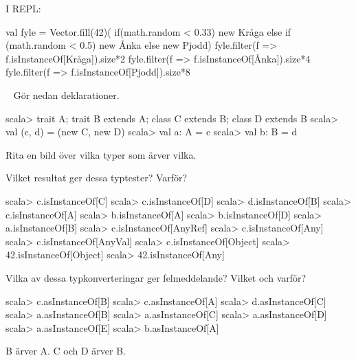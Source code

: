 I REPL:
\begin{REPL}
val fyle = Vector.fill(42)(
  if(math.random < 0.33) new Kråga else
  if (math.random < 0.5) new Ånka else
  new Pjodd)
fyle.filter(f => f.isInstanceOf[Kråga]).size*2
fyle.filter(f => f.isInstanceOf[Ånka]).size*4
fyle.filter(f => f.isInstanceOf[Pjodd]).size*8
\end{REPL}

\QUESTEND






\QUESTBEGIN

\Task  \what~  Gör nedan deklarationer.
\begin{REPL}
scala> trait A; trait B extends A; class C extends B; class D extends B
scala> val (c, d) = (new C, new D)
scala> val a: A = c
scala> val b: B = d
\end{REPL}

\Subtask Rita en bild över vilka typer som ärver vilka.

\Subtask Vilket resultat ger dessa typtester? Varför?
\begin{REPL}
scala> c.isInstanceOf[C]
scala> c.isInstanceOf[D]
scala> d.isInstanceOf[B]
scala> c.isInstanceOf[A]
scala> b.isInstanceOf[A]
scala> b.isInstanceOf[D]
scala> a.isInstanceOf[B]
scala> c.isInstanceOf[AnyRef]
scala> c.isInstanceOf[Any]
scala> c.isInstanceOf[AnyVal]
scala> c.isInstanceOf[Object]
scala> 42.isInstanceOf[Object]
scala> 42.isInstanceOf[Any]
\end{REPL}

\Subtask Vilka av dessa typkonverteringar ger felmeddelande? Vilket och varför?
\begin{REPL}
scala> c.asInstanceOf[B]
scala> c.asInstanceOf[A]
scala> d.asInstanceOf[C]
scala> a.asInstanceOf[B]
scala> a.asInstanceOf[C]
scala> a.asInstanceOf[D]
scala> a.asInstanceOf[E]
scala> b.asInstanceOf[A]
\end{REPL}



\SOLUTION


\TaskSolved \what


\SubtaskSolved  B ärver A. C och D ärver B.


